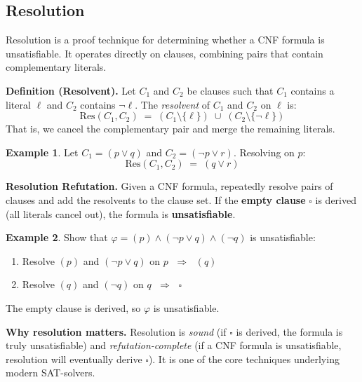 \documentclass[11pt, a4paper]{article}
\theoremstyle{definition}
\newtheorem{example}{Example}[section]
\theoremstyle{remark}
\begin{document}
\subsection{Resolution}

Resolution is a proof technique for determining whether a CNF formula is unsatisfiable.
It operates directly on clauses, combining pairs that contain complementary literals.

\begin{defbox}
\textbf{Definition (Resolvent).}
Let $C_1$ and $C_2$ be clauses such that $C_1$ contains a literal $\ell$ and $C_2$ contains
$\lnot\ell$.  The \emph{resolvent} of $C_1$ and $C_2$ on $\ell$ is:
\[
  \mathrm{Res}(C_1,C_2) \;=\; (C_1\setminus\{\ell\})\;\cup\;(C_2\setminus\{\lnot\ell\})
\]
That is, we cancel the complementary pair and merge the remaining literals.
\end{defbox}

\begin{example}
Let $C_1=(p\lor q)$ and $C_2=(\lnot p\lor r)$.  Resolving on $p$:
\[
  \mathrm{Res}(C_1,C_2) \;=\; (q\lor r)
\]
\end{example}

\begin{defbox}
\textbf{Resolution Refutation.}
Given a CNF formula, repeatedly resolve pairs of clauses and add the resolvents to the
clause set.  If the \textbf{empty clause} $\square$ is derived (all literals cancel out),
the formula is \textbf{unsatisfiable}.
\end{defbox}

\begin{example}
Show that $\varphi=(p)\land(\lnot p\lor q)\land(\lnot q)$ is unsatisfiable:
\begin{enumerate}
  \item Resolve $(p)$ and $(\lnot p\lor q)$ on $p$ $\;\Rightarrow\;$ $(q)$
  \item Resolve $(q)$ and $(\lnot q)$ on $q$ $\;\Rightarrow\;$ $\square$
\end{enumerate}
The empty clause is derived, so $\varphi$ is unsatisfiable.
\end{example}

\begin{insightbox}
\textbf{Why resolution matters.}  Resolution is \emph{sound} (if $\square$ is derived, the
formula is truly unsatisfiable) and \emph{refutation-complete} (if a CNF formula is
unsatisfiable, resolution will eventually derive $\square$).  It is one of the core
techniques underlying modern SAT-solvers.
\end{insightbox}
\end{document}
